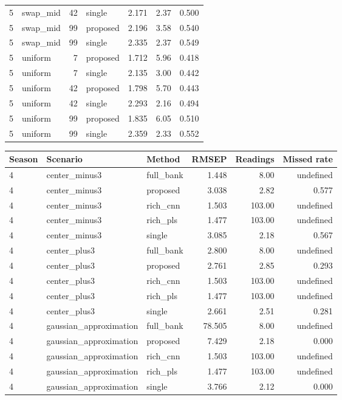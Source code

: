 \documentclass[10pt,a4paper]{article}
\begin{document}
\begin{landscape}
\begin{longtable}{llrlrrr}
5 & swap\_mid & 42 & single & 2.171 & 2.37 & 0.500 \\
5 & swap\_mid & 99 & proposed & 2.196 & 3.58 & 0.540 \\
5 & swap\_mid & 99 & single & 2.335 & 2.37 & 0.549 \\
5 & uniform & 7 & proposed & 1.712 & 5.96 & 0.418 \\
5 & uniform & 7 & single & 2.135 & 3.00 & 0.442 \\
5 & uniform & 42 & proposed & 1.798 & 5.70 & 0.443 \\
5 & uniform & 42 & single & 2.293 & 2.16 & 0.494 \\
5 & uniform & 99 & proposed & 1.835 & 6.05 & 0.510 \\
5 & uniform & 99 & single & 2.359 & 2.33 & 0.552 \\
\bottomrule
\end{longtable}
\clearpage
\begin{longtable}{lllrrr}
\toprule
Season & Scenario & Method & RMSEP & Readings & Missed rate \\
\midrule
4 & center\_minus3 & full\_bank & 1.448 & 8.00 & undefined \\
4 & center\_minus3 & proposed & 3.038 & 2.82 & 0.577 \\
4 & center\_minus3 & rich\_cnn & 1.503 & 103.00 & undefined \\
4 & center\_minus3 & rich\_pls & 1.477 & 103.00 & undefined \\
4 & center\_minus3 & single & 3.085 & 2.18 & 0.567 \\
4 & center\_plus3 & full\_bank & 2.800 & 8.00 & undefined \\
4 & center\_plus3 & proposed & 2.761 & 2.85 & 0.293 \\
4 & center\_plus3 & rich\_cnn & 1.503 & 103.00 & undefined \\
4 & center\_plus3 & rich\_pls & 1.477 & 103.00 & undefined \\
4 & center\_plus3 & single & 2.661 & 2.51 & 0.281 \\
4 & gaussian\_approximation & full\_bank & 78.505 & 8.00 & undefined \\
4 & gaussian\_approximation & proposed & 7.429 & 2.18 & 0.000 \\
4 & gaussian\_approximation & rich\_cnn & 1.503 & 103.00 & undefined \\
4 & gaussian\_approximation & rich\_pls & 1.477 & 103.00 & undefined \\
4 & gaussian\_approximation & single & 3.766 & 2.12 & 0.000 \\

\end{longtable}
\end{landscape}
\end{document}
